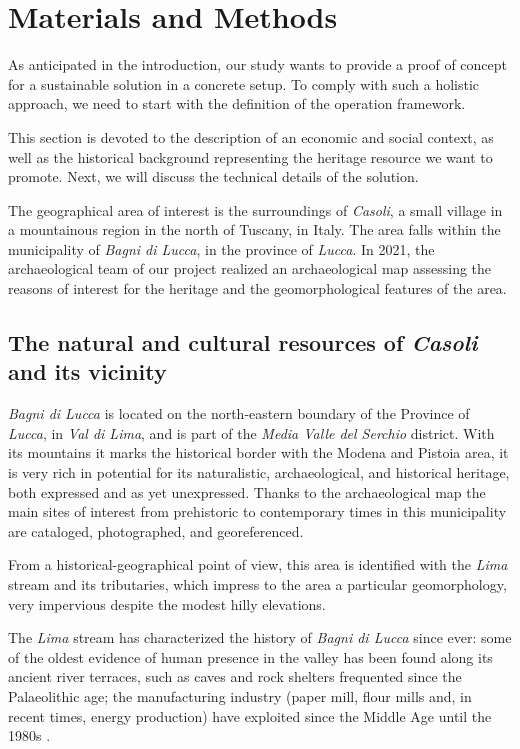 \documentclass[sustainability,article,submit,pdftex,moreauthors]{Definitions/mdpi}
\begin{document}
\section{Materials and Methods}

As anticipated in the introduction, our study wants to provide a proof of concept for a sustainable solution in a concrete setup. To comply with such a holistic approach, we need to start with the definition of the operation framework.

This section is devoted to the description of an economic and social context, as well as the historical background representing the heritage resource we want to promote. Next, we will discuss the technical details of the solution.

The geographical area of interest is the surroundings of \emph{Casoli}, a small village in a mountainous region in the north of Tuscany, in Italy. The area falls within the municipality of \emph{Bagni di Lucca}, in the province of \emph{Lucca}. In 2021, the archaeological team of our project realized an archaeological map assessing the reasons of interest for the heritage and the geomorphological features of the area.

\subsection{The natural and cultural resources of \emph{Casoli} and its vicinity}

\emph{Bagni di Lucca} is located on the north-eastern boundary of the Province of \emph{Lucca}, in \emph{Val di Lima}, and is part of the \textit{Media Valle del Serchio} district. With its mountains it marks the historical border with the Modena and Pistoia area, it is very rich in potential for its naturalistic, archaeological, and historical heritage, both expressed and as yet unexpressed. Thanks to the archaeological map the main sites of interest from prehistoric to contemporary times in this municipality are cataloged, photographed, and georeferenced.

From a historical-geographical point of view, this area is identified with the \emph{Lima} stream and its tributaries, which impress to the area a particular geomorphology, very impervious despite the modest hilly elevations.

The \emph{Lima} stream has characterized the history of \emph{Bagni di Lucca} since ever: some of the oldest evidence of human presence in the valley has been found along its ancient river terraces, such as caves and rock shelters frequented since the Palaeolithic age; the manufacturing industry (paper mill, flour mills and, in recent times, energy production) have exploited since the Middle Age until the 1980s \cite{men76, bed05, ser21}.
 
\end{document}
